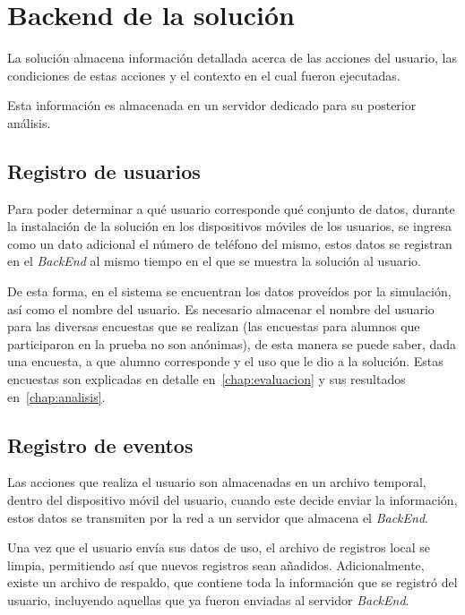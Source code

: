 \section{Backend de la solución}

La solución almacena información detallada acerca de las acciones del usuario,
las condiciones de estas acciones y el contexto en el cual fueron ejecutadas.

Esta información es almacenada en un servidor dedicado para su posterior
análisis.

\subsection{Registro de usuarios}


Para poder determinar a qué usuario corresponde qué conjunto de datos, durante
la instalación de la solución en los dispositivos móviles de los usuarios, se
ingresa como un dato adicional el número de teléfono del mismo, estos datos se
registran en el \textit{BackEnd} al mismo tiempo en el que se muestra la
solución al usuario.

De esta forma, en el sistema se encuentran los datos proveídos por la
simulación, así como el nombre del usuario. Es necesario almacenar el nombre del
usuario para las diversas encuestas que se realizan (las encuestas para alumnos
que participaron en la prueba no son anónimas), de esta manera se puede saber,
dada una encuesta, a que alumno corresponde y el uso que le dio a la solución.
Estas encuestas son explicadas en detalle en~\ref{chap:evaluacion} y sus
resultados en~\ref{chap:analisis}.

\subsection{Registro de eventos}
\label{sec:backend_reg_eventos}

Las acciones que realiza el usuario son almacenadas en un archivo temporal,
dentro del dispositivo móvil del usuario, cuando este decide enviar la
información, estos datos se transmiten por la red a un servidor que almacena el
\textit{BackEnd}.

Una vez que el usuario envía sus datos de uso, el archivo de registros local se
limpia, permitiendo así que nuevos registros sean añadidos. Adicionalmente,
existe un archivo de respaldo, que contiene toda la información que se registró
del usuario, incluyendo aquellas que ya fueron enviadas al servidor
\textit{BackEnd}.

